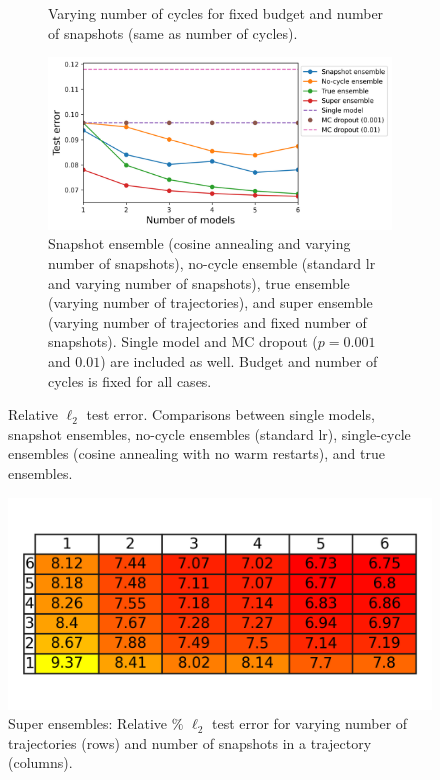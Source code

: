 \begin{figure}[H]
\begin{subfigure}{.45\textwidth}
		\caption{Varying number of cycles for fixed budget and number of snapshots (same as number of cycles).\newline\newline}
		\label{fig:sub-second}
	\end{subfigure}
	\begin{subfigure}{1\textwidth}
		\centering
		\includegraphics[width=.7\linewidth]{./figs/vary_snaps.png}  
		\caption{Snapshot ensemble (cosine annealing and varying number of snapshots), no-cycle ensemble (standard lr and varying number of snapshots), true ensemble (varying number of trajectories), and super ensemble (varying number of trajectories and fixed number of snapshots). Single model and MC dropout ($p = 0.001$ and $0.01$) are included as well. Budget and number of cycles is fixed for all cases.}
		\label{fig:sub-second}
	\end{subfigure}
	\caption{Relative $\ell_2$ test error. Comparisons between single models, snapshot ensembles, no-cycle ensembles (standard lr), single-cycle ensembles (cosine annealing with no warm restarts), and true ensembles.}
	\label{fig:fig}
\end{figure}

\begin{figure}[H]
	\centering
	\includegraphics[width=0.6\linewidth]{./figs/kmn_plot.png}  
	\caption{Super ensembles: Relative $\%$ $\ell_2$ test error for varying number of trajectories (rows) and number of snapshots in a trajectory (columns).}
	\label{fig:sub-first}
\end{figure}

